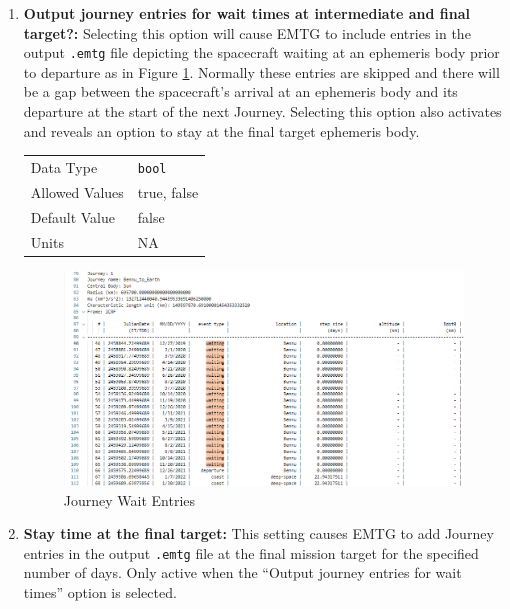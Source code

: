 \begin{enumerate}
    \item{\textbf{Output journey entries for wait times at intermediate and final target?:}} Selecting this option will cause \ac{EMTG} to include entries in the output \verb|.emtg| file depicting the spacecraft waiting at an ephemeris body prior to departure as in Figure \ref{fig:journey_wait_entries}. Normally these entries are skipped and there will be a gap between the spacecraft's arrival at an ephemeris body and its departure at the start of the next Journey. Selecting this option also activates and reveals an option to stay at the final target ephemeris body.
        
        \begin{table}[H]
            \hspace{2cm}
            \begin{tabular}{ll}
            Data Type & \verb|bool| \\
            Allowed Values & true, false \\
            Default Value & false \\
            Units & NA
            \end{tabular}
        \end{table}

        \begin{figure}[H]
            \centering
            \includegraphics[width=0.95\linewidth]{../../shared_latex_inputs/images/output_wait_entries.png}
            \caption{Journey Wait Entries}
            \label{fig:journey_wait_entries}
        \end{figure}



    \item{\textbf{Stay time at the final target:}} This setting causes \ac{EMTG} to add Journey entries in the output \verb|.emtg| file at the final mission target for the specified number of days. Only active when the ``Output journey entries for wait times'' option is selected.
        

\end{enumerate}
